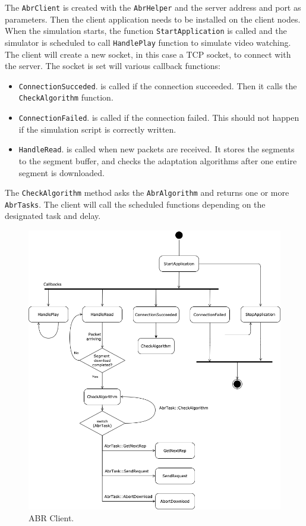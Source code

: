 The \texttt{AbrClient} is created with the \texttt{AbrHelper} and the server address and port as
parameters.
Then the client application needs to be installed
on the client nodes. When the simulation starts, the function \texttt{StartApplication} is called
and the simulator is scheduled to call \texttt{HandlePlay} function to simulate video watching.
The client will create a new socket, in this case a TCP socket, to connect with the server.
The socket is set will various callback functions:
\begin{itemize}[noitemsep,topsep=0pt]
  \item \texttt{ConnectionSucceded}. is called if the connection succeeded. Then it calls
  the \texttt{CheckAlgorithm} function.
  \item \texttt{ConnectionFailed}. is called if the connection failed. This should not 
  happen if the simulation script is correctly written.
  \item \texttt{HandleRead}. is called when new packets are received. It stores the segments 
  to the segment buffer, and checks the adaptation algorithms after one entire segment is downloaded.
\end{itemize}

The \texttt{CheckAlgorithm} method asks the \texttt{AbrAlgorithm} and returns
one or more \texttt{AbrTasks}. The client will call the scheduled 
functions depending on the designated task and delay.

\begin{figure}[]
  \centering
  \includegraphics[width=\textwidth]{img/abrclient.png}
  \caption{ABR Client.}
  \label{fig:abrclient}
\end{figure}

